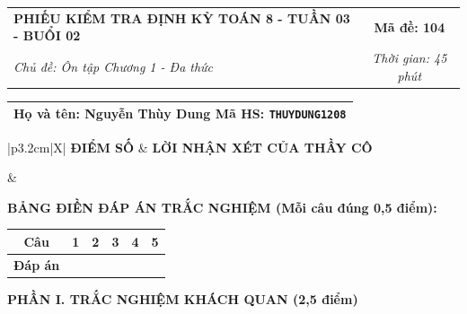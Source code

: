 \documentclass[12pt,a4paper]{article}
\begin{document}
\newpage


\noindent
\begin{tabularx}{\linewidth}{|X|c|}
\hline
\textbf{PHIẾU KIỂM TRA ĐỊNH KỲ TOÁN 8 - TUẦN 03 - BUỔI 02} & \textbf{Mã đề: 104} \\
\textit{Chủ đề: Ôn tập Chương 1 - Đa thức} & \textit{Thời gian: 45 phút} \\
\hline
\end{tabularx}

\vspace{1mm}

\noindent
\begin{tabularx}{\linewidth}{|X|}
\hline
\rule[-2mm]{0pt}{7.5mm}\textbf{Họ và tên:} \textbf{\large Nguyễn Thùy Dung} \hfill \textbf{Mã HS:} \texttt{THUYDUNG1208} \quad \\
\hline
\end{tabularx}

\vspace{1mm}

\noindent
\begin{tabularx}{\linewidth}{|p{3.2cm}|X|}
\hline
\centering\textbf{ĐIỂM SỐ} & \centering\textbf{LỜI NHẬN XÉT CỦA THẦY CÔ} \tabularnewline
\hline
\rule{0pt}{1.3cm} & \tabularnewline
\hline
\end{tabularx}

\vspace{1.2mm}

\noindent\textbf{BẢNG ĐIỀN ĐÁP ÁN TRẮC NGHIỆM (Mỗi câu đúng 0,5 điểm):}
\vspace{0.8mm}

\noindent
\renewcommand{\arraystretch}{1.35}
\begin{tabularx}{\linewidth}{|c|*{5}{>{\centering\arraybackslash}X|}}
\hline
\textbf{Câu} & \textbf{1} & \textbf{2} & \textbf{3} & \textbf{4} & \textbf{5} \\
\hline
\textbf{Đáp án} & & & & & \\
\hline
\end{tabularx}
\renewcommand{\arraystretch}{1.0}

\vspace{1.5mm}

\noindent\textbf{\large PHẦN I. TRẮC NGHIỆM KHÁCH QUAN (2,5 điểm)}
\vspace{1mm}
\end{document}
